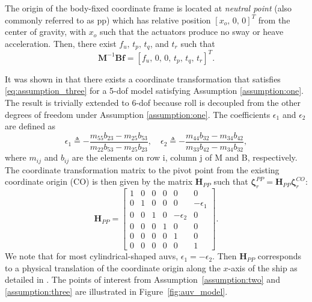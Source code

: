 \begin{assumption}\label{assumption:three}
    The origin of the body-fixed coordinate frame is located at \textit{neutral point} (also commonly referred to as \gls{pp}) which has relative position $[x_o,\,0,\,0]^T$ from the center of gravity, with $x_o$ such that the actuators produce no sway or heave acceleration. Then, there exist $f_u, \, t_p, \, t_q$, and $t_r$ such that
    \begin{equation}\label{eq:assumption_three}
        \mathbf{M}^{-1}\mathbf{Bf} = [f_u,\, 0,\, 0,\, t_p, \, t_q, \, t_r]^T.
    \end{equation}
\end{assumption}

It was shown in \cite{borhaug_straight_2007} that there exists a coordinate transformation that satisfies \eqref{eq:assumption_three} for a 5-\gls{dof} model satisfying Assumption \ref{assumption:one}. The result is trivially extended to 6-\gls{dof} because roll is decoupled from the other degrees of freedom under Assumption \ref{assumption:one}. The coefficients $\epsilon_1$ and $\epsilon_2$ are defined as
\begin{equation}\label{eq:borhaug_transformation}
    \epsilon_1 \triangleq -\frac{m_{55}b_{23} - m_{25}b_{53}}{m_{22}b_{53} - m_{25}b_{23}}, \quad \epsilon_2 \triangleq -\frac{m_{44}b_{32} - m_{34}b_{42}}{m_{33}b_{42} - m_{34}b_{32}},
\end{equation}
where $m_{ij}$ and $b_{ij}$ are the elements on row i, column j of M and B, respectively. The coordinate transformation matrix to the pivot point from the existing coordinate origin (CO) is then given by the matrix $\mathbf{H}_{PP}$ such that $\bm{\zeta}_r^{PP} = \mathbf{H}_{PP} \bm{\zeta}_r^{CO}$:
\begin{equation}\label{eq:pp_transform_matrix}
    \mathbf{H}_{PP} = \begin{bmatrix}
1 & 0 & 0 & 0 & 0 & 0\\
0 & 1 & 0 & 0 & 0 & -\epsilon_1\\
0 & 0 & 1 & 0 & -\epsilon_2 & 0\\
0 & 0 & 0 & 1 & 0 & 0\\
0 & 0 & 0 & 0 & 1 & 0\\
0 & 0 & 0 & 0 & 0 & 1
    \end{bmatrix}.
\end{equation}
We note that for most cylindrical-shaped \glspl{auv}, $\epsilon_1 = -\epsilon_2$. Then $\mathbf{H}_{PP}$ corresponds to a physical translation of the coordinate origin along the $x$-axis of the ship as detailed in \cite[Appendix C]{fossen_handbook_2021}. The points of interest from Assumption~\ref{assumption:two} and \ref{assumption:three} are illustrated in Figure~\ref{fig:auv_model}.
